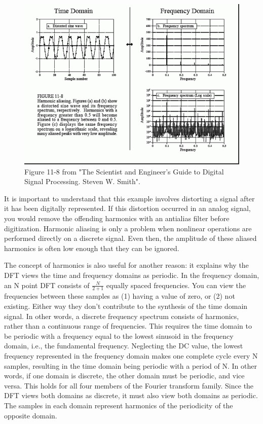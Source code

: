 \documentclass{amsart}
\theoremstyle{definition}
\begin{document}
\begin{enumerate}
\begin{figure}[h]
\centering
\includegraphics[width=.6\textwidth]{fig2.png}
\caption{\label{fig:fig}Figure 11-8 from "The Scientist and Engineer's Guide to
Digital Signal Processing. Steven W. Smith".}
\end{figure}

It is important to understand that this example involves distorting a signal after it has been digitally represented. If this distortion occurred in an analog signal, you would remove the offending harmonics with an antialias filter before digitization. Harmonic aliasing is only a problem when nonlinear operations are performed directly on a discrete signal. Even then, the amplitude of these aliased harmonics is often low enough that they can be ignored.

The concept of harmonics is also useful for another reason: it explains why the DFT views the time and frequency domains as periodic. In the frequency domain, an N point DFT consists of $\frac{N}{2+1}$ equally spaced frequencies. You can view the frequencies between these samples as (1) having a value of zero, or (2) not existing. Either way they don't contribute to the synthesis of the time domain signal. In other words, a discrete frequency spectrum consists of harmonics, rather than a continuous range of frequencies. This requires the time domain to be periodic with a frequency equal to the lowest sinusoid in the frequency domain, i.e., the fundamental frequency. Neglecting the DC value, the lowest frequency represented in the frequency domain makes one complete cycle every N samples, resulting in the time domain being periodic with a period of N. In other words, if one domain is discrete, the other domain must be periodic, and vice versa. This holds for all four members of the Fourier transform family. Since the DFT views both domains as discrete, it must also view both domains as periodic. The samples in each domain represent harmonics of the periodicity of the opposite domain.






\end{enumerate}
\end{document}
